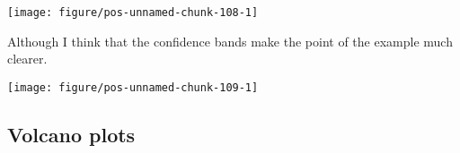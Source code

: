 \documentclass[paper=a4,10pt,div=17,headsepline,BCOR=12mm,twoside,open=right]{scrbook}\usepackage{knitr}
\begin{document}
\begin{knitrout}\footnotesize
{}\color{fgcolor}\begin{kframe}
\begin{alltt}
  \hlopt{+}
  \hlstd{(}\hlstd{=}\hlstd{,} \hlstd{=}\hlstd{,} \hlstd{=}\hlstd{)} \hlopt{+}
  \hlstd{(}\hlstd{=}\hlstd{,} \hlstd{=}\hlstd{)} \hlopt{+}
  \hlstd{(}\hlopt{~} \hlstd{=}\hlstd{)} \hlopt{+}
  \hlstd{(}\hlstd{)}
\end{alltt}
\end{kframe}

{\centering \texttt{[image: figure/pos-unnamed-chunk-108-1]} 

}



\end{knitrout}

Although I think that the confidence bands make the point of the example much clearer.

\begin{knitrout}\footnotesize
{}\color{fgcolor}\begin{kframe}
\begin{alltt}
  \hlopt{+}
  \hlstd{(}\hlstd{=}\hlstd{,} \hlstd{=}\hlstd{,} \hlstd{=}\hlstd{)} \hlopt{+}
  \hlstd{(}\hlstd{=}\hlstd{)} \hlopt{+}
  \hlstd{(}\hlopt{~} \hlstd{=}\hlstd{)} \hlopt{+}
  \hlstd{(}\hlstd{)}
\end{alltt}
\end{kframe}

{\centering \texttt{[image: figure/pos-unnamed-chunk-109-1]} 

}



\end{knitrout}

\subsection{Volcano plots}
\end{document}

